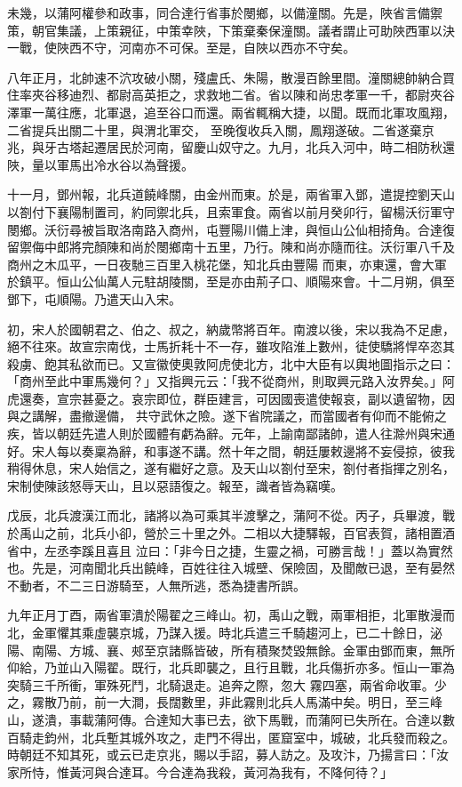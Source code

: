 \begin{pinyinscope}
 未幾，以蒲阿權參和政事，同合達行省事於閿鄉，以備潼關。先是，陜省言備禦策，朝官集議，上策親征，中策幸陜，下策棄秦保潼關。議者謂止可助陜西軍以決一戰，使陜西不守，河南亦不可保。至是，自陜以西亦不守矣。



 八年正月，北帥速不泬攻破小關，殘盧氏、朱陽，散漫百餘里間。潼關總帥納合買住率夾谷移迪烈、都尉高英拒之，求救地二省。省以陳和尚忠孝軍一千，都尉夾谷澤軍一萬往應，北軍退，追至谷口而還。兩省輒稱大捷，以聞。既而北軍攻風翔，二省提兵出關二十里，與渭北軍交，
 至晚復收兵入關，鳳翔遂破。二省遂棄京兆，與牙古塔起遷居民於河南，留慶山奴守之。九月，北兵入河中，時二相防秋還陜，量以軍馬出冷水谷以為聲援。



 十一月，鄧州報，北兵道饒峰關，由金州而東。於是，兩省軍入鄧，遣提控劉天山以劄付下襄陽制置司，約同禦北兵，且索軍食。兩省以前月癸卯行，留楊沃衍軍守閿鄉。沃衍尋被旨取洛南路入商州，屯豐陽川備上津，與恒山公仙相掎角。合達復留禦侮中郎將完顏陳和尚於閿鄉南十五里，乃行。陳和尚亦隨而往。沃衍軍八千及商州之木瓜平，一日夜馳三百里入桃花堡，知北兵由豐陽
 而東，亦東還，會大軍於鎮平。恒山公仙萬人元駐胡陵關，至是亦由荊子口、順陽來會。十二月朔，俱至鄧下，屯順陽。乃遣天山入宋。



 初，宋人於國朝君之、伯之、叔之，納歲幣將百年。南渡以後，宋以我為不足慮，絕不往來。故宣宗南伐，士馬折耗十不一存，雖攻陷淮上數州，徒使驕將悍卒恣其殺虜、飽其私欲而已。又宣徽使奧敦阿虎使北方，北中大臣有以輿地圖指示之曰：「商州至此中軍馬幾何？」又指興元云：「我不從商州，則取興元路入汝界矣。」阿虎還奏，宣宗甚憂之。哀宗即位，群臣建言，可因國喪遣使報哀，副以遺留物，因與之講解，盡撤邊備，
 共守武休之險。遂下省院議之，而當國者有仰而不能俯之疾，皆以朝廷先遣人則於國體有虧為辭。元年，上諭南鄙諸帥，遣人往滁州與宋通好。宋人每以奏稟為辭，和事遂不講。然十年之間，朝廷屢敕邊將不妄侵掠，彼我稍得休息，宋人始信之，遂有繼好之意。及天山以劄付至宋，劄付者指揮之別名，宋制使陳該怒辱天山，且以惡語復之。報至，識者皆為竊嘆。



 戊辰，北兵渡漢江而北，諸將以為可乘其半渡擊之，蒲阿不從。丙子，兵畢渡，戰於禹山之前，北兵小卻，營於三十里之外。二相以大捷驛報，百官表賀，諸相置酒省中，左丞李蹊且喜且
 泣曰：「非今日之捷，生靈之禍，可勝言哉！」蓋以為實然也。先是，河南聞北兵出饒峰，百姓往往入城壁、保險固，及聞敵已退，至有晏然不動者，不二三日游騎至，人無所逃，悉為捷書所誤。



 九年正月丁酉，兩省軍潰於陽翟之三峰山。初，禹山之戰，兩軍相拒，北軍散漫而北，金軍懼其乘虛襲京城，乃謀入援。時北兵遣三千騎趨河上，已二十餘日，泌陽、南陽、方城、襄、郟至京諸縣皆破，所有積聚焚毀無餘。金軍由鄧而東，無所仰給，乃並山入陽翟。既行，北兵即襲之，且行且戰，北兵傷折亦多。恒山一軍為突騎三千所衝，軍殊死鬥，北騎退走。追奔之際，忽大
 霧四塞，兩省命收軍。少之，霧散乃前，前一大澗，長闊數里，非此霧則北兵人馬滿中矣。明日，至三峰山，遂潰，事載蒲阿傳。合達知大事已去，欲下馬戰，而蒲阿已失所在。合達以數百騎走鈞州，北兵塹其城外攻之，走門不得出，匿窟室中，城破，北兵發而殺之。時朝廷不知其死，或云已走京兆，賜以手詔，募人訪之。及攻汴，乃揚言曰：「汝家所恃，惟黃河與合達耳。今合達為我殺，黃河為我有，不降何待？」




\end{pinyinscope}
